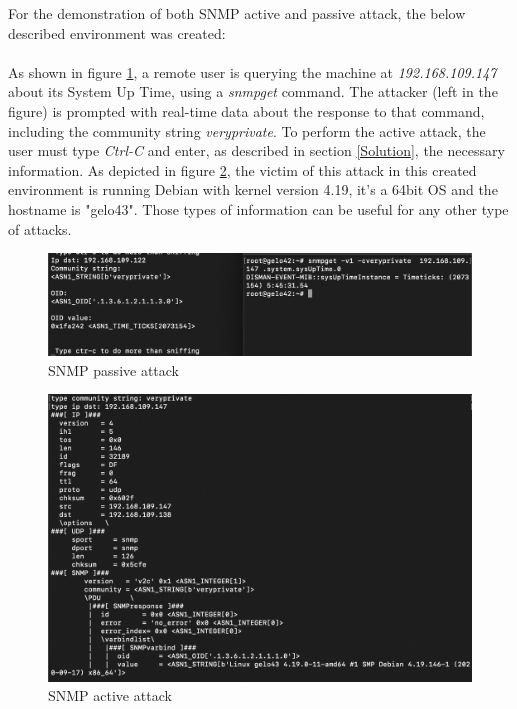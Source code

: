 For the demonstration of both SNMP active and passive attack, the below described environment was created: 
\\\\
As shown in figure \ref{fig:SNMPPassiveAttack}, a remote user is querying the machine at \textit{192.168.109.147} about its System Up Time, using a \textit{snmpget} command. The attacker (left in the figure) is prompted with real-time data about the response to that command, including the community string \textit{veryprivate}. To perform the active attack, the user must type \textit{Ctrl-C} and enter, as described in section \ref{Solution}, the necessary information. As depicted in figure \ref{fig:SNMPActiveAttack}, the victim of this attack in this created environment is running Debian with kernel version 4.19, it's a 64bit OS and the hostname is "gelo43". Those types of information can be useful for any other type of attacks. 

\begin{figure}[h!]
    \centering
    \includegraphics[width=1\linewidth,keepaspectratio]{SNMPSniffing.png}
    \caption{SNMP passive attack}
    \label{fig:SNMPPassiveAttack}
\end{figure}
\FloatBarrier

\begin{figure}[h!]
    \centering
    \includegraphics[width=1\linewidth,keepaspectratio]{SNMPAttack.png}
    \caption{SNMP active attack}
    \label{fig:SNMPActiveAttack}
\end{figure}
\FloatBarrier


